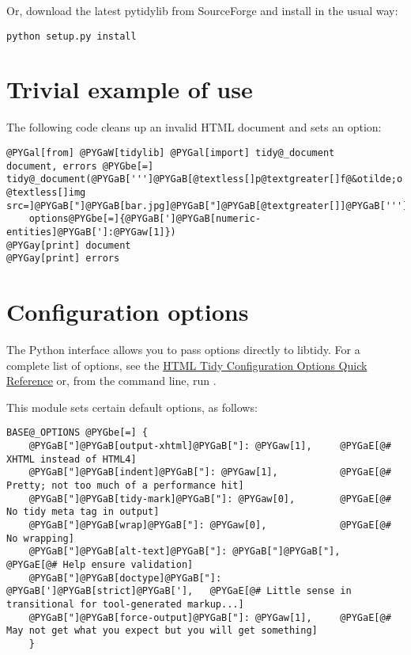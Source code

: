 \documentclass[letterpaper,10pt,english]{howto}
\begin{document}
Or, download the latest pytidylib from SourceForge and install in the usual way:

\begin{Verbatim}[commandchars=@\[\]]
python setup.py install
\end{Verbatim}


\section{Trivial example of use}

The following code cleans up an invalid HTML document and sets an option:

\begin{Verbatim}[commandchars=@\[\]]
@PYGal[from] @PYGaW[tidylib] @PYGal[import] tidy@_document
document, errors @PYGbe[=] tidy@_document(@PYGaB[''']@PYGaB[@textless[]p@textgreater[]f@&otilde;o @textless[]img src=]@PYGaB["]@PYGaB[bar.jpg]@PYGaB["]@PYGaB[@textgreater[]]@PYGaB['''],
    options@PYGbe[=]{@PYGaB[']@PYGaB[numeric-entities]@PYGaB[']:@PYGaw[1]})
@PYGay[print] document
@PYGay[print] errors
\end{Verbatim}


\section{Configuration options}

The Python interface allows you to pass options directly to libtidy. For a complete list of options, see the \href{http://tidy.sourceforge.net/docs/quickref.html}{HTML Tidy Configuration Options Quick Reference} or, from the command line, run .

This module sets certain default options, as follows:

\begin{Verbatim}[commandchars=@\[\]]
BASE@_OPTIONS @PYGbe[=] {
    @PYGaB["]@PYGaB[output-xhtml]@PYGaB["]: @PYGaw[1],     @PYGaE[@# XHTML instead of HTML4]
    @PYGaB["]@PYGaB[indent]@PYGaB["]: @PYGaw[1],           @PYGaE[@# Pretty; not too much of a performance hit]
    @PYGaB["]@PYGaB[tidy-mark]@PYGaB["]: @PYGaw[0],        @PYGaE[@# No tidy meta tag in output]
    @PYGaB["]@PYGaB[wrap]@PYGaB["]: @PYGaw[0],             @PYGaE[@# No wrapping]
    @PYGaB["]@PYGaB[alt-text]@PYGaB["]: @PYGaB["]@PYGaB["],        @PYGaE[@# Help ensure validation]
    @PYGaB["]@PYGaB[doctype]@PYGaB["]: @PYGaB[']@PYGaB[strict]@PYGaB['],   @PYGaE[@# Little sense in transitional for tool-generated markup...]
    @PYGaB["]@PYGaB[force-output]@PYGaB["]: @PYGaw[1],     @PYGaE[@# May not get what you expect but you will get something]
    }
\end{Verbatim}
\end{document}

